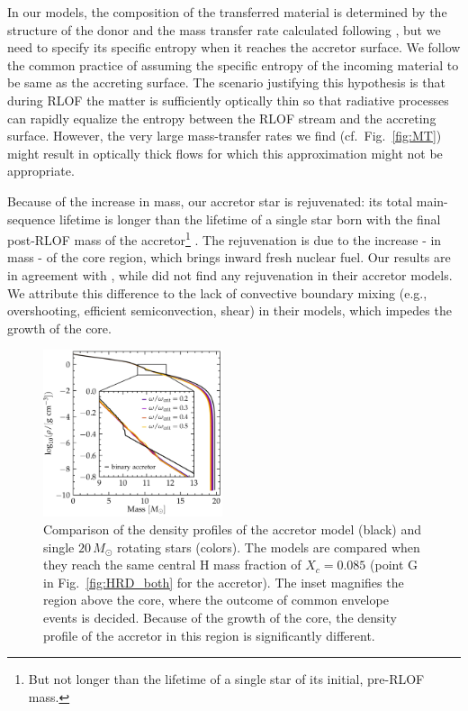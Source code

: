 \documentclass[twocolumn,twocolappendix,trackchanges]{aastex63}
\DeclareRobustCommand{\Figref}[1]{Fig.~\ref{#1}}
\begin{document}
In our models, the composition of the transferred material is
determined by the structure of the donor and the mass transfer rate
calculated following \cite{kolb:90}, but we need to specify its
specific entropy when it reaches the accretor surface. We follow the
common practice of assuming the specific entropy of the incoming
material to be same as the accreting surface. The scenario justifying
this hypothesis is that during RLOF the matter is
sufficiently optically thin so that radiative processes can rapidly
equalize the entropy between the RLOF stream and the accreting
surface. However, the very large mass-transfer rates we find
(cf.~\Figref{fig:MT}) might result in optically thick flows for which
this approximation might not be appropriate.

Because of the increase in mass, our accretor star is rejuvenated: its
total main-sequence lifetime is longer than the lifetime of a single
star born with the final post-RLOF mass of the accretor\footnote{But
  not longer than the lifetime of a single star of its initial,
  pre-RLOF mass.}
\citep[e.g.,][]{schneider:16}. The rejuvenation is due to the increase
- in mass - of the core region, which brings inward fresh
nuclear fuel. Our results are in agreement with \cite{hellings:83},
while \cite{braun:95} did not find any rejuvenation in their accretor
models. We attribute this difference to the lack of convective
boundary mixing (e.g., overshooting, efficient semiconvection, shear)
in their models, which impedes the growth of the core.

\begin{figure}[htbp]
  \includegraphics[width=0.47\textwidth]{rho_comparison}
  \caption{Comparison of the density profiles of the accretor model
    (black) and single $20\,M_\odot$ rotating stars (colors). The models are
    compared when they reach the same central H mass fraction of
    $X_c=0.085$ (point G in \Figref{fig:HRD_both} for the accretor). The inset magnifies the region above the core, where the outcome of common envelope events is
    decided. Because of the growth of the core, the density profile of
  the accretor in this region is significantly different.}
  \label{fig:rho}
\end{figure}
\end{document}
